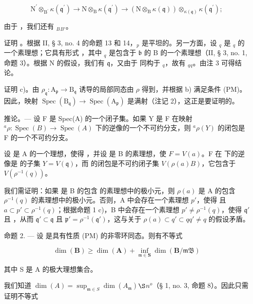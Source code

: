 \[
\mathrm{N} ^ {\prime} \otimes_ {\mathrm{B} ^ {\prime}} \kappa (\mathfrak {q} ^ {\prime}) \rightarrow \mathrm{N} \otimes_ {\mathrm{B}} \kappa (\mathfrak {q} ^ {\prime}) \rightarrow (\mathrm{N} \otimes_ {\mathrm{B}} \kappa (\mathfrak {q})) \otimes_ {\kappa (\mathfrak {q})} \kappa (\mathfrak {q} ^ {\prime});
\]

由于  ，我们还有 \(_{B}\)\(_{B'}\)。

证明  。根据 II, § 3, no. 4 的命题 13 和 14，\(_{p}\) 是平坦的。另一方面，设 \(_{q}\) 是 \(_{q}\) 的一个素理想；它具有形式  ，其中 \(_{q}\) 是包含于 \(\mathfrak{b}\) 的 B 的一个素理想（II, § 3, no. 1, 命题 3）。根据 N 的假设，我们有 \(\mathfrak{q}\)，又由于  同构于 \(_{q}\)，故有 \(_{q}\)\(_{q}\)。由注 3 可得结论。

证明 c)。由 \(\rho_{\mathfrak{q}}: \mathrm{A}_{\mathfrak{p}} \to \mathrm{B}_{\mathfrak{q}}\) 诱导的局部同态由 \(\rho\) 得到，并根据 b) 满足条件 (PM)。因此，映射 \(\operatorname{Spec}(\mathrm{B}_{\mathfrak{q}}) \to \operatorname{Spec}(\mathrm{A}_{\mathfrak{p}})\) 是满射（注记 2），这正是要证明的。

推论。--- 设 F 是 Spec(A) 的一个闭子集。如果 Y 是 F 在映射 \(^{a}\rho : \operatorname{Spec}(B) \to \operatorname{Spec}(A)\) 下的逆像的一个不可约分支，则 \(^{a}\rho(Y)\) 的闭包是 F 的一个不可约分支。

设  是 A 的一个理想，使得  ，并设  是 B 的素理想，使 \(F = V(a)\)。F 在  下的逆像是  的子集 \(Y = V(\mathfrak{q})\)，而  的闭包是不可约闭子集 \(V(\rho(a)B)\)，它包含于 \(V(\rho^{-1}(q))\)。

我们需证明：如果  是 B 的包含  的素理想中的极小元，则 \(\rho(a)\) 是 A 的包含 \(\rho^{-1}(q)\) 的素理想中的极小元。否则，A 中会存在一个素理想 \(p'\)，使得  且 \(a \subset p' \subset \rho^{-1}(q)\)；根据命题 1 c)，B 中会存在一个素理想 \(p' \neq \rho^{-1}(q)\)，使得 \(\mathfrak{q}'\) 且 ，从而 \(\mathfrak{q}' \subset \mathfrak{q}\) 且 \(\mathfrak{p}' = \rho^{-1}(\mathfrak{q}')\)，这与关于 \(\rho(a) \subset q' \subset q\)\(q' \neq q\) 的假设矛盾。

命题 2. --- 设  是具有性质 (PM) 的非零环同态。则有不等式

\[
\dim (\mathbf {B}) \geqslant \dim (\mathbf {A}) + \inf _ {\mathfrak {m} \in \mathbf {S}} \dim (\mathbf {B} / \mathfrak {m B})\tag{1}
\]

其中 S 是 A 的极大理想集合。

我们知道 \(\dim(A) = \sup_{\mathfrak m \in S} \dim(A_{\mathfrak m})\)\(\S\)\(n^o\)（§ 1, no. 3, 命题 8）。因此只需证明不等式

